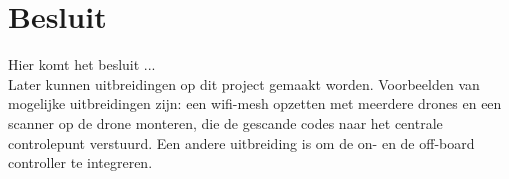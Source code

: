 \chapter{Besluit}
Hier komt het besluit ...\\

Later kunnen uitbreidingen op dit project gemaakt worden.
Voorbeelden van mogelijke uitbreidingen zijn: een wifi-mesh opzetten met meerdere 	drones en een scanner op de drone monteren, die de gescande codes naar het centrale controlepunt verstuurd.
Een andere uitbreiding is om de on- en de off-board controller te integreren.